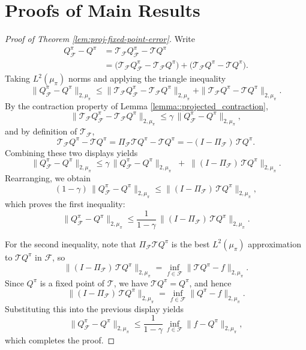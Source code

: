 \documentclass{article}
\theoremstyle{plain}
\theoremstyle{definition}
\theoremstyle{remark}
\begin{document}
\section{Proofs of Main Results}
 
\begin{proof}[Proof of Theorem \ref{lem:proj-fixed-point-error}]
Write
\begin{align*}
    Q^{\pi}_{\mathcal F} - Q^{\pi}
&=
\mathcal T_{\mathcal F} Q^{\pi}_{\mathcal F} - \mathcal T Q^{\pi}\\
&=
\bigl(\mathcal T_{\mathcal F} Q^{\pi}_{\mathcal F} 
      - \mathcal T_{\mathcal F} Q^{\pi}\bigr)
+
\bigl(\mathcal T_{\mathcal F} Q^{\pi} - \mathcal T Q^{\pi}\bigr).
\end{align*}
Taking $L^{2}({\mu_\pi})$ norms and applying the triangle inequality
\[
\| Q^{\pi}_{\mathcal F} - Q^{\pi} \|_{2,{\mu_\pi}}
\le
\| \mathcal T_{\mathcal F} Q^{\pi}_{\mathcal F} 
     - \mathcal T_{\mathcal F} Q^{\pi} \|_{2,{\mu_\pi}}
+
\| \mathcal T_{\mathcal F} Q^{\pi} - \mathcal T Q^{\pi} \|_{2,{\mu_\pi}}.
\]
By the contraction property of Lemma \ref{lemma::projected_contraction}, 
\[
\| \mathcal T_{\mathcal F} Q^{\pi}_{\mathcal F} 
     - \mathcal T_{\mathcal F} Q^{\pi} \|_{2,{\mu_\pi}}
\le
\gamma\,\| Q^{\pi}_{\mathcal F} - Q^{\pi} \|_{2,{\mu_\pi}},
\]
and by definition of $\mathcal T_{\mathcal F}$,
\[
\mathcal T_{\mathcal F} Q^{\pi} - \mathcal T Q^{\pi}
=
\Pi_{\mathcal F} \mathcal T Q^{\pi} - \mathcal T Q^{\pi}
=
- (I - \Pi_{\mathcal F})\,\mathcal T Q^{\pi}.
\]
Combining these two displays yields
\[
\| Q^{\pi}_{\mathcal F} - Q^{\pi} \|_{2,{\mu_\pi}}
\le
\gamma\,\| Q^{\pi}_{\mathcal F} - Q^{\pi} \|_{2,{\mu_\pi}}
\;+\;
\bigl\|(I - \Pi_{\mathcal F})\,\mathcal T Q^{\pi}\bigr\|_{2,{\mu_\pi}}.
\]
Rearranging, we obtain
\[
(1-\gamma)\,\| Q^{\pi}_{\mathcal F} - Q^{\pi} \|_{2,{\mu_\pi}}
\le
\bigl\|(I - \Pi_{\mathcal F})\,\mathcal T Q^{\pi}\bigr\|_{2,{\mu_\pi}},
\]
which proves the first inequality:
\[
\| Q^{\pi}_{\mathcal F} - Q^{\pi} \|_{2,{\mu_\pi}}
\le
\frac{1}{1-\gamma}\,
\bigl\|(I - \Pi_{\mathcal F})\,\mathcal T Q^{\pi}\bigr\|_{2,{\mu_\pi}}.
\]

For the second inequality, note that 
$\Pi_{\mathcal F} \mathcal T Q^{\pi}$ is the best $L^{2}({\mu_\pi})$ 
approximation to $\mathcal T Q^{\pi}$ in $\mathcal F$, so
\[
\bigl\|(I - \Pi_{\mathcal F})\,\mathcal T Q^{\pi}\bigr\|_{2,{\mu_\pi}}
=
\inf_{f \in \mathcal F} \| \mathcal T Q^{\pi} - f \|_{2,{\mu_\pi}}.
\]
Since \(Q^\pi\) is a fixed point of \(\mathcal T\), we have 
\(\mathcal T Q^\pi = Q^\pi\), and hence
\[
\bigl\|(I - \Pi_{\mathcal F})\,\mathcal T Q^{\pi}\bigr\|_{2,{\mu_\pi}}
=
\inf_{f \in \mathcal F} \| Q^{\pi} - f \|_{2,{\mu_\pi}}.
\]
Substituting this into the previous display yields
\[
\| Q^{\pi}_{\mathcal F} - Q^{\pi} \|_{2,{\mu_\pi}}
\le
\frac{1}{1-\gamma}\,
\inf_{f \in \mathcal F} \| f - Q^{\pi} \|_{2,{\mu_\pi}},
\]
which completes the proof.
\end{proof}
\end{document}
